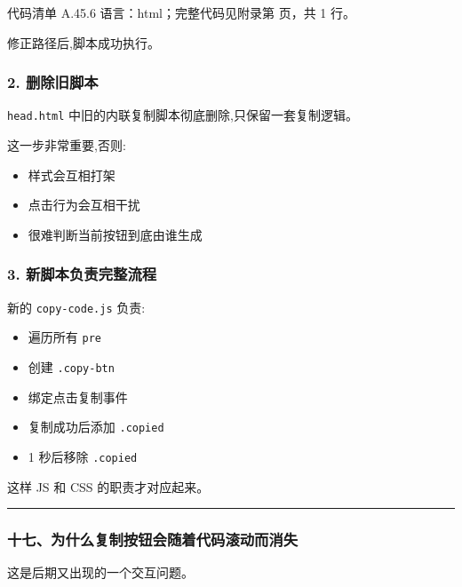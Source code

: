 \documentclass[lang=cn,scheme=chinese,color=blue,device=normal,toc=onecol,math=cm]{elegantbook}
\begin{document}
\begin{codeindexbox}{代码清单 A.45.6}
语言：html；完整代码见附录第 \pageref{code:45:6} 页，共 1 行。
\end{codeindexbox}


修正路径后,脚本成功执行。\par


\subsubsection{2. 删除旧脚本}


\texttt{head.html} 中旧的内联复制脚本彻底删除,只保留一套复制逻辑。\par


这一步非常重要,否则:\par


\begin{itemize}
\item 样式会互相打架
\item 点击行为会互相干扰
\item 很难判断当前按钮到底由谁生成
\end{itemize}


\subsubsection{3. 新脚本负责完整流程}


新的 \texttt{copy-code.js} 负责:\par


\begin{itemize}
\item 遍历所有 \texttt{pre}
\item 创建 \texttt{.copy-btn}
\item 绑定点击复制事件
\item 复制成功后添加 \texttt{.copied}
\item 1 秒后移除 \texttt{.copied}
\end{itemize}


这样 JS 和 CSS 的职责才对应起来。\par


\medskip\hrule\medskip


\subsubsection{十七、为什么复制按钮会随着代码滚动而消失}


这是后期又出现的一个交互问题。\par
\end{document}

